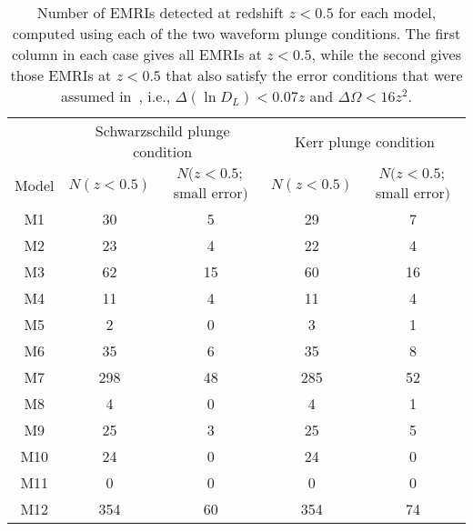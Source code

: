 \documentclass[a4paper]{jpconf}
\begin{document}
\begin{table}
\begin{center}
\begin{tabular}{c|cc|cc}
&\multicolumn{2}{|c|}{Schwarzschild plunge condition}&\multicolumn{2}{|c}{Kerr plunge condition}\\
Model&$N(z<0.5)$&$N(z<0.5; $ small error$)$&$N(z<0.5)$&$N(z<0.5; $ small error$)$\\\hline
M1&30&5&29&7\\
M2&23&4&22&4\\
M3&62&15&60&16\\
M4&11&4&11&4\\
M5&2&0&3&1\\
M6&35&6&35&8\\
M7&298&48&285&52\\
M8&4&0&4&1\\
M9&25&3&25&5\\
M10&24&0&24&0\\
M11&0&0&0&0\\
M12&354&60&354&74\\
\end{tabular}
\end{center}
\caption{\label{tab:cosmology}Number of EMRIs detected at redshift $z < 0.5$ for each model, computed using each of the two waveform plunge conditions. The first column in each case gives all EMRIs at $z < 0.5$, while the second gives those EMRIs at $z < 0.5$ that also satisfy the error  conditions that were assumed in~\cite{McLeodHogan}, i.e., $\Delta(\ln D_L) < 0.07z$ and $\Delta\Omega < 16 z^2$.}
\end{table}
\end{document}
